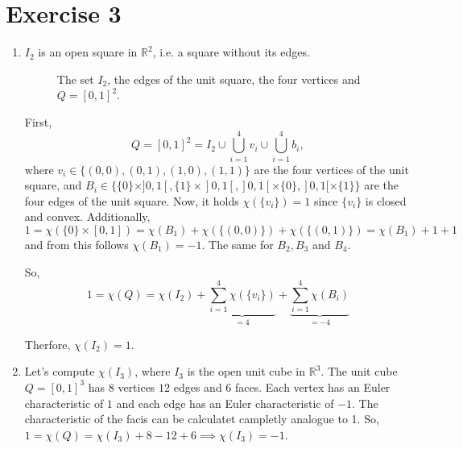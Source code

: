 \documentclass{article}
\begin{document}
\section*{Exercise 3}
\begin{enumerate}
    \item $I_2$ is an open square in $\mathbb R^2$, i.e. a square without its edges.
    \begin{figure}[htbp]
        \centering
        \caption{The set $I_2$, the edges of the unit square, the four vertices and $Q=[0,1]^2$.}
    \end{figure}

    First, 
    $$
        Q = [0,1]^2 = I_2 \cup \bigcup_{i=1}^4 v_i \cup \bigcup^4_{i=1} b_i,
    $$ 
    where $v_i \in \{ (0,0),(0,1),(1,0),(1,1) \}$ are the four vertices of the unit square, and $B_i \in \{\{0\} \times ]0,1[, \{1\} \times ]0,1[, ]0,1[ \times \{0\}, ]0,1[ \times \{1\} \}$ are the four edges of the unit square. Now, it holds $\chi(\{v_i\}) = 1$ since $\{v_i\}$ is closed and convex. Additionally, 
    $$
        1 = \chi(\{0\} \times [0,1]) = \chi(B_1) + \chi(\{(0,0)\}) + \chi(\{(0,1)\}) = \chi(B_1) + 1 + 1
    $$ 
    and from this follows $\chi(B_1) = -1$. The same for $B_2, B_3$ and $B_4$.

    So, 
    $$
        1 = \chi(Q) = \chi(I_2) + \underbrace{\sum^4_{i=1}\chi(\{v_i\})}_{=4} + \underbrace{\sum^4_{i=1}\chi(B_i)}_{=-4} 
    $$

    Therfore, $\chi(I_2) = 1$.

    \item Let's compute $\chi(I_3)$, where $I_3$ is the open unit cube in $\mathbb R^3$. The unit cube $Q = [0,1]^3$ has $8$ vertices $12$ edges and $6$ faces. Each vertex has an Euler characteristic of $1$ and each edge has an Euler characteristic of $-1$. The characteristic of the facis can be calculatet campletly analogue to 1. So, $1=\chi(Q) = \chi(I_3) + 8 - 12 +6 \implies \chi(I_3) = -1$.
\end{enumerate}
\end{document}
